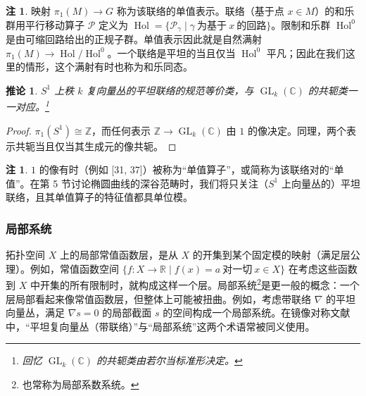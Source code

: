 \documentclass[11pt,a4paper]{article}
\theoremstyle{plain}
\newtheorem{corollary}[theorem]{推论}
\theoremstyle{definition}
\newtheorem{remark}[theorem]{注}
\begin{document}

\begin{remark}
映射 $\pi_1(M)\to G$ 称为该联络的单值表示。联络（基于点 $x\in M$）的和乐群用平行移动算子 $\mathcal{P}$ 定义为 $\operatorname{Hol}=\{\mathcal{P}_\gamma\mid \gamma\ \text{为基于}\ x\ \text{的回路}\}$。限制和乐群 $\operatorname{Hol}^0$ 是由可缩回路给出的正规子群。单值表示因此就是自然满射 $\pi_1(M)\to\operatorname{Hol}/\operatorname{Hol}^0$。一个联络是平坦的当且仅当 $\operatorname{Hol}^0$ 平凡；因此在我们这里的情形，这个满射有时也称为和乐同态。
\end{remark}

\begin{corollary}
$S^1$ 上秩 $k$ 复向量丛的平坦联络的规范等价类，与 $\operatorname{GL}_k(\mathbb{C})$ 的共轭类一一对应。\footnote{回忆 $\operatorname{GL}_k(\mathbb{C})$ 的共轭类由若尔当标准形决定。}
\end{corollary}
\begin{proof}
$\pi_1(S^1)\cong\mathbb{Z}$，而任何表示 $\mathbb{Z}\to\operatorname{GL}_k(\mathbb{C})$ 由 $1$ 的像决定。同理，两个表示共轭当且仅当其生成元的像共轭。
\end{proof}

\begin{remark}
$1$ 的像有时（例如 [31, 37]）被称为“单值算子”，或简称为该联络对的“单值”。在第 5 节讨论椭圆曲线的深谷范畴时，我们将只关注（$S^1$ 上向量丛的）平坦联络，且其单值算子的特征值都具单位模。
\end{remark}

\subsubsection{局部系统}

拓扑空间 $X$ 上的局部常值函数层，是从 $X$ 的开集到某个固定模的映射（满足层公理）。例如，常值函数空间 $\{f\colon X\to\mathbb{R}\mid f(x)=a\ \text{对一切}\ x\in X\}$ 在考虑这些函数到 $X$ 中开集的所有限制时，就构成这样一个层。局部系统\footnote{也常称为局部系数系统。}是更一般的概念：一个层局部看起来像常值函数层，但整体上可能被扭曲。例如，考虑带联络 $\nabla$ 的平坦向量丛，满足 $\nabla s=0$ 的局部截面 $s$ 的空间构成一个局部系统。在镜像对称文献中，“平坦复向量丛（带联络）”与“局部系统”这两个术语常被同义使用。
\end{document}

